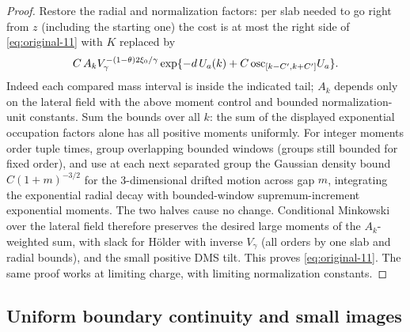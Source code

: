 \begin{proof}
Restore the radial and normalization factors: per slab needed to go right from \(z\) (including the starting one) the cost is at most the right side of \eqref{eq:original-11} with \(K\) replaced by
\[
 C\,A_k V_\gamma^{-(1-\theta)2\xi_0/\gamma}
 \exp\{-d\,U_a(k)+C\,{\rm osc}_{[k-C',k+C']}U_a\}.
\]
Indeed each compared mass interval is inside the indicated tail; \(A_k\) depends only on the lateral field with the above moment control and bounded normalization-unit constants.
Sum the bounds over all \(k\): the sum of the displayed exponential occupation factors alone has all positive moments uniformly.
For integer moments order tuple times, group overlapping bounded windows (groups still bounded for fixed order), and use at each next separated group the Gaussian density bound \(C(1+m)^{-3/2}\) for the 3-dimensional drifted motion across gap \(m\), integrating the exponential radial decay with bounded-window supremum-increment exponential moments.
The two halves cause no change.
Conditional Minkowski over the lateral field therefore preserves the desired large moments of the \(A_k\)-weighted sum, with slack for Hölder with inverse \(V_\gamma\) (all orders by one slab and radial bounds), and the small positive DMS tilt.
This proves \eqref{eq:original-11}.
The same proof works at limiting charge, with limiting normalization constants.

\end{proof}

\subsection{Uniform boundary continuity and small images}\label{proxy:consequences}

